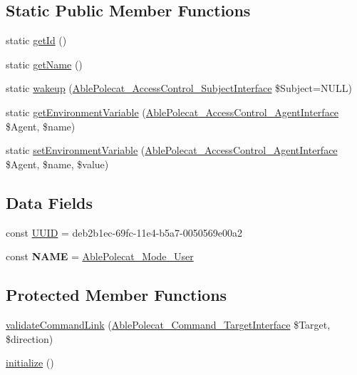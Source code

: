 \subsection*{Static Public Member Functions}
\begin{DoxyCompactItemize}
\item 
static \hyperlink{class_able_polecat___mode___user_acfaa3a96d0cb5a4c0d4d710dcba41e9e}{get\+Id} ()
\item 
static \hyperlink{class_able_polecat___mode___user_a4ef9bd37ba3ce8a13c1e8bcf4f72a630}{get\+Name} ()
\item 
static \hyperlink{class_able_polecat___mode___user_a3f2135f6ad45f51d075657f6d20db2cd}{wakeup} (\hyperlink{interface_able_polecat___access_control___subject_interface}{Able\+Polecat\+\_\+\+Access\+Control\+\_\+\+Subject\+Interface} \$Subject=N\+U\+L\+L)
\item 
static \hyperlink{class_able_polecat___mode___user_a04e7e0f41da8037ae797868b61b6df77}{get\+Environment\+Variable} (\hyperlink{interface_able_polecat___access_control___agent_interface}{Able\+Polecat\+\_\+\+Access\+Control\+\_\+\+Agent\+Interface} \$Agent, \$name)
\item 
static \hyperlink{class_able_polecat___mode___user_a68bdefd00518f09963ea3fa95cd2a242}{set\+Environment\+Variable} (\hyperlink{interface_able_polecat___access_control___agent_interface}{Able\+Polecat\+\_\+\+Access\+Control\+\_\+\+Agent\+Interface} \$Agent, \$name, \$value)
\end{DoxyCompactItemize}
\subsection*{Data Fields}
\begin{DoxyCompactItemize}
\item 
const \hyperlink{class_able_polecat___mode___user_a74b892c8c0b86bf9d04c5819898c51e7}{U\+U\+I\+D} = \textquotesingle{}deb2b1ec-\/69fc-\/11e4-\/b5a7-\/0050569e00a2\textquotesingle{}
\item 
\hypertarget{class_able_polecat___mode___user_a244352f035b82b20b0efa506167fd862}{}const {\bfseries N\+A\+M\+E} = \textquotesingle{}\hyperlink{class_able_polecat___mode___user}{Able\+Polecat\+\_\+\+Mode\+\_\+\+User}\textquotesingle{}\label{class_able_polecat___mode___user_a244352f035b82b20b0efa506167fd862}

\end{DoxyCompactItemize}
\subsection*{Protected Member Functions}
\begin{DoxyCompactItemize}
\item 
\hyperlink{class_able_polecat___mode___user_a37906da60d0165610266b97b07bc5267}{validate\+Command\+Link} (\hyperlink{interface_able_polecat___command___target_interface}{Able\+Polecat\+\_\+\+Command\+\_\+\+Target\+Interface} \$Target, \$direction)
\item 
\hyperlink{class_able_polecat___mode___user_a91098fa7d1917ce4833f284bbef12627}{initialize} ()
\end{DoxyCompactItemize}
